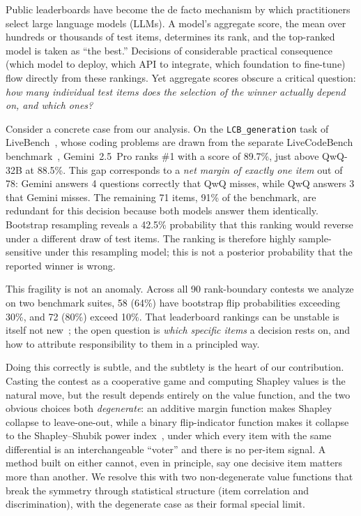 \documentclass[conference]{IEEEtran}
\begin{document}
Public leaderboards have become the de facto mechanism by which practitioners select large language models (LLMs).
A model's aggregate score, the mean over hundreds or thousands of test items, determines its rank, and the top-ranked model is taken as ``the best.''
Decisions of considerable practical consequence (which model to deploy, which API to integrate, which foundation to fine-tune) flow directly from these rankings.
Yet aggregate scores obscure a critical question: \emph{how many individual test items does the selection of the winner actually depend on, and which ones?}

Consider a concrete case from our analysis.
On the \texttt{LCB\_generation} task of LiveBench~\cite{livebench}, whose coding problems are drawn from the separate LiveCodeBench benchmark~\cite{jain2024livecodebench}, Gemini~2.5~Pro ranks \#1 with a score of 89.7\%, just above QwQ-32B at 88.5\%.
This gap corresponds to a \emph{net margin of exactly one item} out of 78: Gemini answers 4 questions correctly that QwQ misses, while QwQ answers 3 that Gemini misses.
The remaining 71 items, 91\% of the benchmark, are redundant for this decision because both models answer them identically.
Bootstrap resampling reveals a 42.5\% probability that this ranking would reverse under a different draw of test items.
The ranking is therefore highly sample-sensitive under this resampling model; this is not a posterior probability that the reported winner is wrong.

This fragility is not an anomaly.
Across all 90 rank-boundary contests we analyze on two benchmark suites, 58 (64\%) have bootstrap flip probabilities exceeding 30\%, and 72 (80\%) exceed 10\%.
That leaderboard rankings can be unstable is itself not new~\cite{alzahrani2024benchmarks, miller2024adding}; the open question is \emph{which specific items} a decision rests on, and how to attribute responsibility to them in a principled way.

Doing this correctly is subtle, and the subtlety is the heart of our contribution.
Casting the contest as a cooperative game and computing Shapley values is the natural move, but the result depends entirely on the value function, and the two obvious choices both \emph{degenerate}: an additive margin function makes Shapley collapse to leave-one-out, while a binary flip-indicator function makes it collapse to the Shapley--Shubik power index~\cite{shapleyshubik1954}, under which every item with the same differential is an interchangeable ``voter'' and there is no per-item signal.
A method built on either cannot, even in principle, say one decisive item matters more than another.
We resolve this with two non-degenerate value functions that break the symmetry through statistical structure (item correlation and discrimination), with the degenerate case as their formal special limit.
\end{document}
